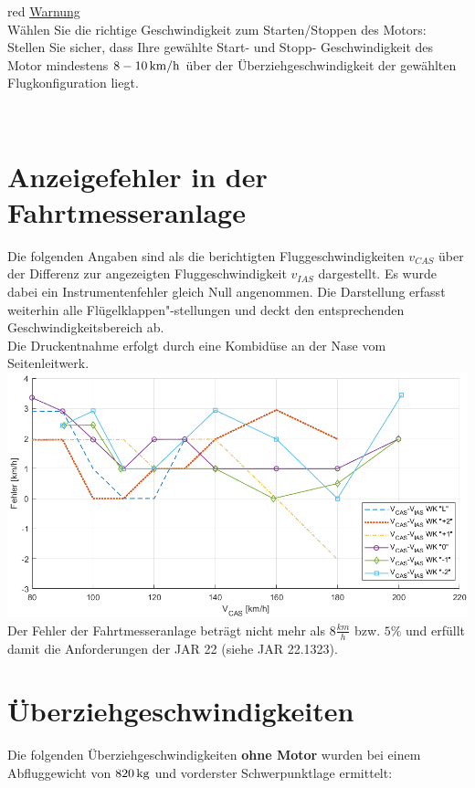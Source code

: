 \begin{color}{red}
\large{\underline{Warnung}}\\
Wählen Sie die richtige Geschwindigkeit zum Starten/Stoppen des Motors: \\
Stellen Sie sicher, dass Ihre gewählte Start- und Stopp- Geschwindigkeit des Motor mindestens $\unit[8-10]{km/h}$ über der Überziehgeschwindigkeit der gewählten Flugkonfiguration liegt.
\end{color}\\
\newpage
\section{Anzeigefehler in der Fahrtmesseranlage}
Die folgenden Angaben sind als die berichtigten Fluggeschwindigkeiten $v_{CAS}$ über der Differenz zur angezeigten Fluggeschwindigkeit $v_{IAS}$ dargestellt. Es wurde dabei ein Instrumentenfehler gleich Null angenommen. Die Darstellung erfasst weiterhin alle Flügelklappen"-stellungen und deckt den entsprechenden Geschwindigkeitsbereich ab.\\
\newline
Die Druckentnahme erfolgt durch eine Kombidüse an der Nase vom Seitenleitwerk.\\
\newline
\includegraphics[width=\textwidth]{Fahrtmesserkalibrierung2.png}
\newline
Der Fehler der Fahrtmesseranlage beträgt nicht mehr als $8 \frac{km}{h}$ bzw. $5\%$ und erfüllt damit die Anforderungen der JAR 22 (siehe JAR 22.1323).

\section{Überziehgeschwindigkeiten}

Die folgenden Überziehgeschwindigkeiten \textbf{ohne Motor} wurden bei einem Abfluggewicht von $\unit[820]{kg}$ und vorderster Schwerpunktlage ermittelt:\\

